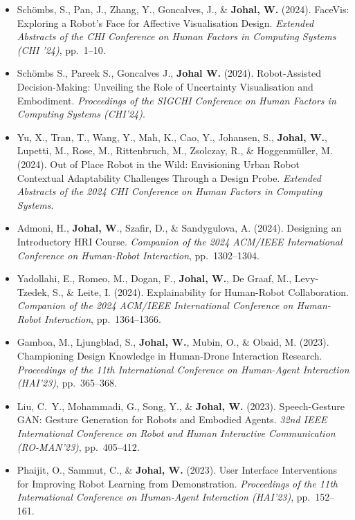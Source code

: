 \begin{itemize}[nosep]
    \item Schömbs, S., Pan, J., Zhang, Y., Goncalves, J., \& \textbf{Johal, W.} (2024). FaceVis: Exploring a Robot's Face for Affective Visualisation Design. \textit{Extended Abstracts of the CHI Conference on Human Factors in Computing Systems (CHI '24)}, pp.\ 1--10.

    \item Schömbs S., Pareek S., Goncalves J., \textbf{Johal W.} (2024). Robot-Assisted Decision-Making: Unveiling the Role of Uncertainty Visualisation and Embodiment. \textit{Proceedings of the SIGCHI Conference on Human Factors in Computing Systems (CHI'24)}.

    \item Yu, X., Tran, T., Wang, Y., Mah, K., Cao, Y., Johansen, S., \textbf{Johal, W.}, Lupetti, M., Rose, M., Rittenbruch, M., Zsolczay, R., \& Hoggenmüller, M. (2024). Out of Place Robot in the Wild: Envisioning Urban Robot Contextual Adaptability Challenges Through a Design Probe. \textit{Extended Abstracts of the 2024 CHI Conference on Human Factors in Computing Systems}.

    \item Admoni, H., \textbf{Johal, W}., Szafir, D., \& Sandygulova, A. (2024). Designing an Introductory HRI Course. \textit{Companion of the 2024 ACM/IEEE International Conference on Human-Robot Interaction}, pp.\ 1302--1304.

    \item Yadollahi, E., Romeo, M., Dogan, F., \textbf{Johal, W.}, De Graaf, M., Levy-Tzedek, S., \& Leite, I. (2024). Explainability for Human-Robot Collaboration. \textit{Companion of the 2024 ACM/IEEE International Conference on Human-Robot Interaction}, pp.\ 1364--1366.

    \item Gamboa, M., Ljungblad, S., \textbf{Johal, W.}, Mubin, O., \& Obaid, M. (2023). Championing Design Knowledge in Human-Drone Interaction Research. \textit{Proceedings of the 11th International Conference on Human-Agent Interaction (HAI'23)}, pp.\ 365--368.

    \item Liu, C.\ Y., Mohammadi, G., Song, Y., \& \textbf{Johal, W.} (2023). Speech-Gesture GAN: Gesture Generation for Robots and Embodied Agents. \textit{32nd IEEE International Conference on Robot and Human Interactive Communication (RO-MAN'23)}, pp.\ 405--412.

    \item Phaijit, O., Sammut, C., \& \textbf{Johal, W.} (2023). User Interface Interventions for Improving Robot Learning from Demonstration. \textit{Proceedings of the 11th International Conference on Human-Agent Interaction (HAI'23)}, pp.\ 152--161.


\end{itemize}
